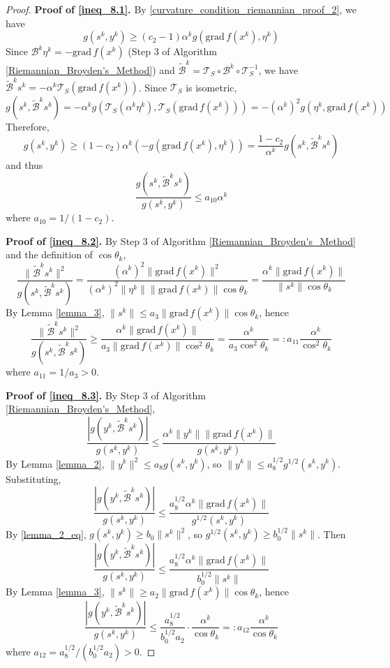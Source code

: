 \documentclass[12pt,a4paper,draft]{article}  %
\theoremstyle{definition}
\numberwithin{equation}{section}
\newcommand{\grad}{\mathrm{grad}\,}
\newcommand{\VT}{\mathcal{T}}
\begin{document}
\begin{proof}
        \textbf{Proof of \eqref{ineq_8.1}.} By \eqref{curvature_condition_riemannian_proof_2}, we have
        \[
        g(s^k,y^k) \geq (c_2-1)\alpha^k g(\grad f(x^k), \eta^k)
        \]
        Since $\mathcal{B}^k\eta^k = -\grad f(x^k)$ (Step 3 of Algorithm \ref{Riemannian_Broyden's_Method}) and $\tilde{\mathcal{B}}^k = \VT_S \circ \mathcal{B}^k \circ \VT_S^{-1}$, we have $\tilde{\mathcal{B}}^ks^k = -\alpha^k\VT_S(\grad f(x^k))$. Since $\VT_S$ is isometric,
        \[
        g(s^k, \tilde{\mathcal{B}}^ks^k) = -\alpha^k g(\VT_S(\alpha^k\eta^k), \VT_S(\grad f(x^k))) = -(\alpha^k)^2 g(\eta^k, \grad f(x^k))
        \]
        Therefore,
        \[
        g(s^k, y^k) \geq (1-c_2)\alpha^k\left(-g(\grad f(x^k), \eta^k)\right) = \frac{1-c_2}{\alpha^k}g(s^k, \tilde{\mathcal{B}}^ks^k)
        \]
        and thus
        \[
        \frac{g(s^k,\tilde{\mathcal{B}}^ks^k)}{g(s^k,y^k)} \leq a_{10}\alpha^k
        \]
        where $a_{10} = 1/(1-c_2)$.

        \textbf{Proof of \eqref{ineq_8.2}.} By Step 3 of Algorithm \ref{Riemannian_Broyden's_Method} and the definition of $\cos\theta_k$,
        \[
        \frac{\|\tilde{\mathcal{B}}^ks^k\|^2}{g(s^k, \tilde{\mathcal{B}}^ks^k)} = \frac{(\alpha^k)^2\|\grad f(x^k)\|^2}{(\alpha^k)^2\|\eta^k\|\|\grad f(x^k)\|\cos\theta_k} = \frac{\alpha^k\|\grad f(x^k)\|}{\|s^k\|\cos\theta_k}
        \]
        By Lemma \ref{lemma_3}, $\|s^k\| \leq a_3\|\grad f(x^k)\|\cos\theta_k$, hence
        \[
        \frac{\|\tilde{\mathcal{B}}^ks^k\|^2}{g(s^k, \tilde{\mathcal{B}}^ks^k)} \geq \frac{\alpha^k\|\grad f(x^k)\|}{a_3\|\grad f(x^k)\|\cos^2\theta_k} = \frac{\alpha^k}{a_3\cos^2\theta_k} =: a_{11}\frac{\alpha^k}{\cos^2\theta_k}
        \]
        where $a_{11} = 1/a_3 > 0$.

        \textbf{Proof of \eqref{ineq_8.3}.} By Step 3 of Algorithm \ref{Riemannian_Broyden's_Method},
        \[
        \frac{|g(y^k,\tilde{\mathcal{B}}^ks^k)|}{g(s^k,y^k)} \leq \frac{\alpha^k\|y^k\|\|\grad f(x^k)\|}{g(s^k,y^k)}
        \]
        By Lemma \ref{lemma_2}, $\|y^k\|^2 \leq a_8 g(s^k,y^k)$, so $\|y^k\| \leq a_8^{1/2}g^{1/2}(s^k,y^k)$. Substituting,
        \[
        \frac{|g(y^k,\tilde{\mathcal{B}}^ks^k)|}{g(s^k,y^k)} \leq \frac{a_8^{1/2}\alpha^k\|\grad f(x^k)\|}{g^{1/2}(s^k,y^k)}
        \]
        By \eqref{lemma_2_eq}, $g(s^k,y^k) \geq b_0\|s^k\|^2$, so $g^{1/2}(s^k,y^k) \geq b_0^{1/2}\|s^k\|$. Then
        \[
        \frac{|g(y^k,\tilde{\mathcal{B}}^ks^k)|}{g(s^k,y^k)} \leq \frac{a_8^{1/2}\alpha^k\|\grad f(x^k)\|}{b_0^{1/2}\|s^k\|}
        \]
        By Lemma \ref{lemma_3}, $\|s^k\| \geq a_2\|\grad f(x^k)\|\cos\theta_k$, hence
        \[
        \frac{|g(y^k,\tilde{\mathcal{B}}^ks^k)|}{g(s^k,y^k)} \leq \frac{a_8^{1/2}}{b_0^{1/2}a_2}\cdot\frac{\alpha^k}{\cos\theta_k} =: a_{12}\frac{\alpha^k}{\cos\theta_k}
        \]
        where $a_{12} = a_8^{1/2}/(b_0^{1/2}a_2) > 0$.
\end{proof}
\end{document}
